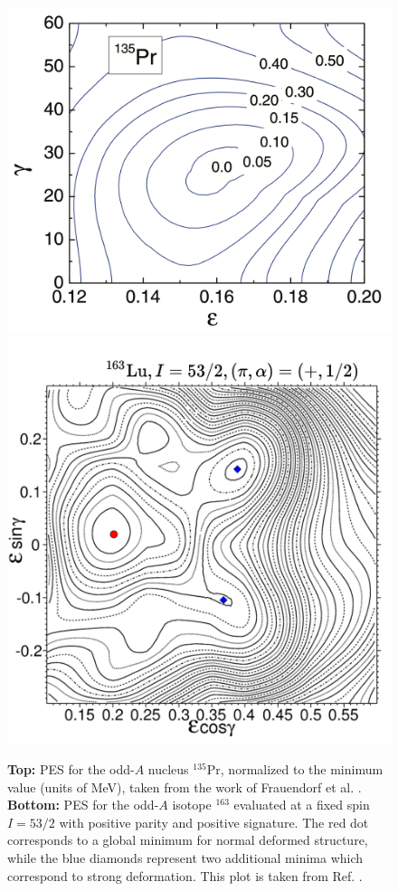 \begin{figure}
    \centering
    \includegraphics[scale=0.16]{Chapters/Figures/135Pr-PES.pdf}
    \includegraphics[scale=0.4]{Chapters/Figures/163Lu-PES.pdf}
    \caption{\textbf{Top:} PES for the odd-$A$ nucleus $^{135}$Pr, normalized to the minimum value (units of MeV), taken from the work of Frauendorf et al. \cite{frauendorf2014transverse}. \textbf{Bottom:} PES for the odd-$A$ isotope $^{163}$ evaluated at a fixed spin $I=53/2$ with positive parity and positive signature. The red dot corresponds to a global minimum for normal deformed structure, while the blue diamonds represent two additional minima which correspond to strong deformation. This plot is taken from Ref. \cite{jensen2002wobbling}.}
    \label{pes-example-set-2}
\end{figure}

